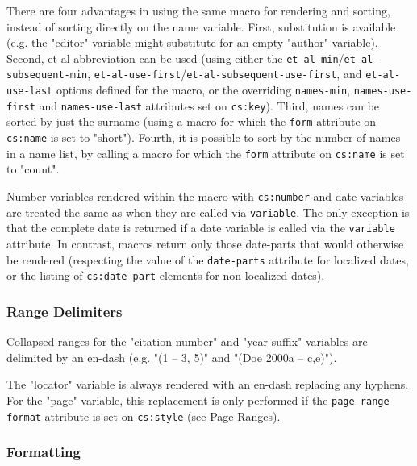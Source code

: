 There are four advantages in using the same macro for rendering and
sorting, instead of sorting directly on the name variable. First,
substitution is available (e.g. the "editor" variable might substitute
for an empty "author" variable). Second, et-al abbreviation can be used
(using either the \texttt{et-al-min}/\texttt{et-al-subsequent-min},
\texttt{et-al-use-first}/\texttt{et-al-subsequent-use-first}, and
\texttt{et-al-use-last} options defined for the macro, or the overriding
\texttt{names-min}, \texttt{names-use-first} and \texttt{names-use-last}
attributes set on \texttt{cs:key}). Third, names can be sorted by just
the surname (using a macro for which the \texttt{form} attribute on
\texttt{cs:name} is set to "short"). Fourth, it is possible to sort by
the number of names in a name list, by calling a macro for which the
\texttt{form} attribute on \texttt{cs:name} is set to "count".

\protect\hyperlink{number-variables}{Number variables} rendered within
the macro with \texttt{cs:number} and
\protect\hyperlink{date-variables}{date variables} are treated the same
as when they are called via \texttt{variable}. The only exception is
that the complete date is returned if a date variable is called via the
\texttt{variable} attribute. In contrast, macros return only those
date-parts that would otherwise be rendered (respecting the value of the
\texttt{date-parts} attribute for localized dates, or the listing of
\texttt{cs:date-part} elements for non-localized dates).

\hypertarget{range-delimiters}{%
\subsubsection{Range Delimiters}\label{range-delimiters}}

Collapsed ranges for the "citation-number" and "year-suffix" variables
are delimited by an en-dash (e.g. "(1 -- 3, 5)" and "(Doe 2000a --
c,e)").

The "locator" variable is always rendered with an en-dash replacing any
hyphens. For the "page" variable, this replacement is only performed if
the \texttt{page-range-format} attribute is set on \texttt{cs:style}
(see \protect\hyperlink{page-ranges}{Page Ranges}).

\hypertarget{formatting}{%
\subsubsection{Formatting}\label{formatting}}

